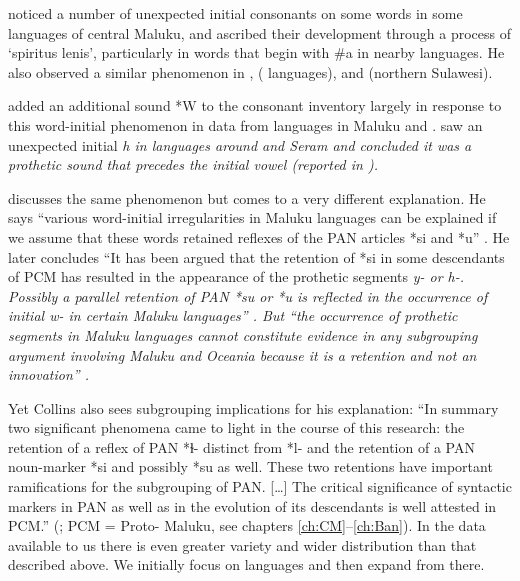\citet[114--118]{Stresemann1927} noticed a number of unexpected initial
consonants on some words in some languages of central Maluku,
and ascribed their development through a process of ‘spiritus
lenis’, particularly in words that begin with {\#}a in nearby languages.
He also observed a similar phenomenon in ,
 ( languages), and  (northern Sulawesi).

\citet{Dyen1962} added an additional sound *W to the 
consonant inventory largely in response to this word-initial
phenomenon in data from languages in Maluku and .
\citet{ChlenovSirk1973} saw an unexpected initial \it{h} in languages
around  and Seram and concluded it was a prothetic sound that precedes
the initial vowel (reported in \citealp[121]{Collins1983}).

\citet[6, 120--128, 130f]{Collins1982d,Collins1983}
discusses the same phenomenon but comes to a very different explanation.
He says “various word-initial irregularities in  Maluku
languages can be explained if we assume that these words retained
reflexes of the PAN articles *si and *u” \citep[6]{Collins1983}.
He later concludes “It has been argued that the retention of
 *si in some descendants of PCM has resulted in the
appearance of the prothetic segments \it{y-} or \it{h-}.
Possibly a parallel retention of PAN *su or *u is reflected in
the occurrence of initial \it{w-} in certain  Maluku languages” \citep[130]{Collins1983}.
But “the occurrence of prothetic segments in  Maluku languages
cannot constitute evidence in any subgrouping argument involving
 Maluku and Oceania because it is a retention
and not an innovation” \citep[131]{Collins1983}.

Yet Collins also sees subgrouping implications for his explanation:
“In summary two significant phenomena came to light in the course
of this research: the retention of a reflex of PAN *ɫ- distinct
from *l- and the retention of a PAN noun-marker *si
and possibly *su as well.
These two retentions have important ramifications for the subgrouping of PAN.
[{\ldots}] The critical significance of syntactic markers in
PAN as well as in the evolution of its descendants is well attested
in PCM.” (\citet[131]{Collins1983}; PCM = Proto- Maluku,
see chapters \ref{ch:CM}--\ref{ch:Ban}).
In the data available to us there is even greater variety
and wider distribution than that described above.
We initially focus on  languages
and then expand from there.

